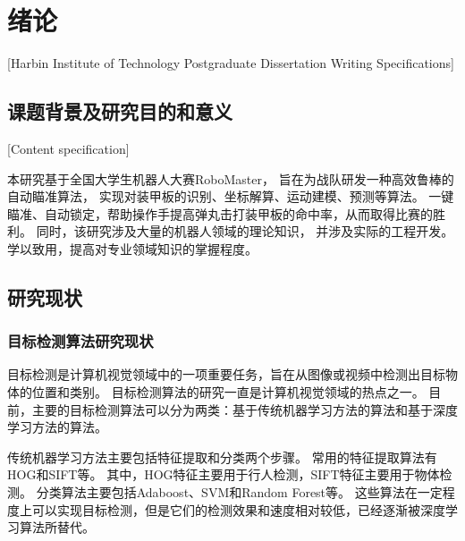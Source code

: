 
\chapter[绪论]{绪论}[Harbin Institute of Technology Postgraduate Dissertation Writing Specifications]

\section{课题背景及研究目的和意义}[Content specification]

本研究基于全国大学生机器人大赛RoboMaster，
旨在为战队研发一种高效鲁棒的自动瞄准算法，
实现对装甲板的识别、坐标解算、运动建模、预测等算法。
一键瞄准、自动锁定，帮助操作手提高弹丸击打装甲板的命中率，从而取得比赛的胜利。
同时，该研究涉及大量的机器人领域的理论知识，
并涉及实际的工程开发。学以致用，提高对专业领域知识的掌握程度。

\section{研究现状}

\subsection{目标检测算法研究现状}
目标检测是计算机视觉领域中的一项重要任务，旨在从图像或视频中检测出目标物体的位置和类别。
目标检测算法的研究一直是计算机视觉领域的热点之一。
目前，主要的目标检测算法可以分为两类：基于传统机器学习方法的算法和基于深度学习方法的算法。\par


传统机器学习方法主要包括特征提取和分类两个步骤。
常用的特征提取算法有HOG\cite{pang2011efficient}和SIFT\cite{ng2003sift}等。
其中，HOG特征主要用于行人检测，SIFT特征主要用于物体检测。
分类算法主要包括Adaboost\cite{hastie2009multi}、SVM\cite{schuldt2004recognizing}和Random Forest\cite{biau2016random}等。
这些算法在一定程度上可以实现目标检测，但是它们的检测效果和速度相对较低，已经逐渐被深度学习算法所替代。

\par

